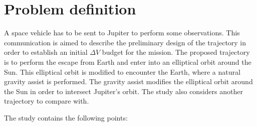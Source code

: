 


\section{Problem definition}\label{sec:problem_definition}

A space vehicle has to be sent to Jupiter to perform some observations. This communication is aimed to describe the preliminary design of the trajectory in order to establish an initial $\Delta V$ budget for the mission. The proposed trajectory is to perform the escape from Earth and enter into an elliptical orbit around the Sun. This elliptical orbit is modified to encounter the Earth, where a natural gravity assist is performed. The gravity assist modifies the elliptical orbit around the Sun in order to intersect Jupiter's orbit. The study also considers another trajectory to compare with.

The study contains the following points:

